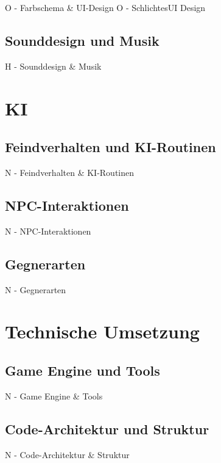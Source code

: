 \documentclass[oneside]{ausarbeitung}
\begin{document}
O - Farbschema & UI-Design
O   - SchlichtesUI Design


\section{Sounddesign und Musik}

H - Sounddesign & Musik


\chapter{KI}

\section{Feindverhalten und KI-Routinen}

N - Feindverhalten & KI-Routinen


\section{NPC-Interaktionen}

N - NPC-Interaktionen


\section{Gegnerarten}

N - Gegnerarten


\chapter{Technische Umsetzung}

\section{Game Engine und Tools}

N - Game Engine & Tools


\section{Code-Architektur und Struktur}

N - Code-Architektur & Struktur
\end{document}
